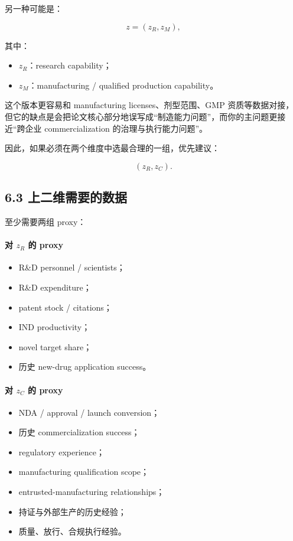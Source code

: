 \documentclass[12pt]{ctexart}
\begin{document}
另一种可能是：

\[
z=(z_R,z_M),
\]

其中：

\begin{itemize}[leftmargin=2em]
    \item \(z_R\)：research capability；
    \item \(z_M\)：manufacturing / qualified production capability。
\end{itemize}

这个版本更容易和 manufacturing licenses、剂型范围、GMP 资质等数据对接，
但它的缺点是会把论文核心部分地误写成“制造能力问题”，而你的主问题更接近“跨企业 commercialization 的治理与执行能力问题”。

因此，如果必须在两个维度中选最合理的一组，优先建议：

\[
(z_R,z_C).
\]

\subsection{6.3 上二维需要的数据}

至少需要两组 proxy：

\paragraph{对 \(z_R\) 的 proxy}
\begin{itemize}[leftmargin=2em]
    \item R\&D personnel / scientists；
    \item R\&D expenditure；
    \item patent stock / citations；
    \item IND productivity；
    \item novel target share；
    \item 历史 new-drug application success。
\end{itemize}

\paragraph{对 \(z_C\) 的 proxy}
\begin{itemize}[leftmargin=2em]
    \item NDA / approval / launch conversion；
    \item 历史 commercialization success；
    \item regulatory experience；
    \item manufacturing qualification scope；
    \item entrusted-manufacturing relationships；
    \item 持证与外部生产的历史经验；
    \item 质量、放行、合规执行经验。
\end{itemize}
\end{document}
